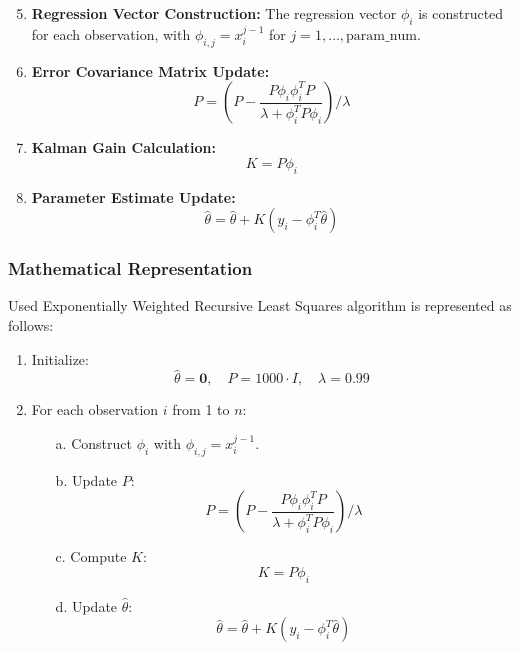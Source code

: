 \begin{enumerate}
    \setcounter{enumi}{4}
    \item \textbf{Regression Vector Construction:}
    The regression vector \( \phi_i \) is constructed for each observation, with \( \phi_{i,j} = x_i^{j-1} \) for \( j = 1, \ldots, \text{param\_num} \).
    
    \item \textbf{Error Covariance Matrix Update:}
    \[ P = \left( P - \frac{P \phi_i \phi_i^T P}{\lambda + \phi_i^T P \phi_i} \right) / \lambda \]
    
    \item \textbf{Kalman Gain Calculation:}
    \[ K = P \phi_i \]
    
    \item \textbf{Parameter Estimate Update:}
    \[ \hat{\theta} = \hat{\theta} + K \left( y_i - \phi_i^T \hat{\theta} \right) \]
\end{enumerate}

\subsubsection*{Mathematical Representation}

Used Exponentially Weighted Recursive Least Squares algorithm is represented as follows:

\begin{enumerate}
    \item Initialize:
    \[ \hat{\theta} = \mathbf{0}, \quad P = 1000 \cdot I, \quad \lambda = 0.99 \]
    
    \item For each observation \(i\) from 1 to \(n\):
    \begin{itemize}
        \item[a.] Construct \( \phi_i \) with \( \phi_{i,j} = x_i^{j-1} \).
        \item[b.] Update \( P \):
        \[ P = \left( P - \frac{P \phi_i \phi_i^T P}{\lambda + \phi_i^T P \phi_i} \right) / \lambda \]
        
        \item[c.] Compute \( K \):
        \[ K = P \phi_i \]
        
        \item[d.] Update \( \hat{\theta} \):
        \[ \hat{\theta} = \hat{\theta} + K \left( y_i - \phi_i^T \hat{\theta} \right) \]
    \end{itemize}
\end{enumerate}

